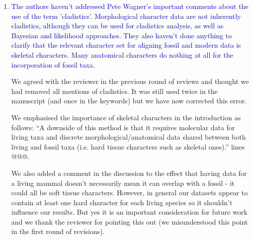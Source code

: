 \documentclass[12pt,letterpaper]{article}
\begin{document}
\begin{enumerate}
\item{\textcolor{blue}{The authors haven't addressed Pete Wagner's important comments about the use of the term 'cladistics'. Morphological character data are not inherently cladistics, although they can be used for cladistics analysis, as well as Bayesian and likelihood approaches. They also haven't done anything to clarify that the relevant character set for aligning fossil and modern data is skeletal characters. Many anatomical characters do nothing at all for the incorporation of fossil taxa.}}

We agreed with the reviewer in the previous round of reviews and thought we had removed all mentions of cladistics. It was still used twice in the manuscript (and once in the keywords) but we have now corrected this error.

We emphasised the importance of skeletal characters in the introduction as follows:
``A downside of this method is that it requires molecular data for living taxa and discrete morphological/anatomical data shared between both living and fossil taxa (i.e. hard tissue characters such as skeletal ones).''
lines @@@.

We also added a comment in the discussion to the effect that having data for a living mammal doesn't necessarily mean it can overlap with a fossil - it could all be soft tissue characters. However, in general our datasets appear to contain at least one hard character for each living species so it shouldn't influence our results. But yes it is an important consideration for future work and we thank the reviewer for pointing this out (we misunderstood this point in the first round of revisions). %



\end{enumerate}
\end{document}

